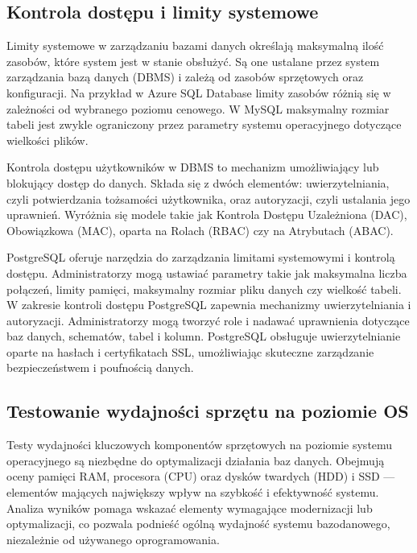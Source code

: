 \documentclass[a4paper,11pt,openany,english]{sphinxmanual}
\begin{document}
\subsection{Kontrola dostępu i limity systemowe}
\label{\detokenize{rozdzial2/Wydajnosc-Skalowanie-i-Replikacja/index:kontrola-dostepu-i-limity-systemowe}}
\sphinxAtStartPar
Limity systemowe w zarządzaniu bazami danych określają maksymalną ilość zasobów, które system jest w stanie obsłużyć. Są one ustalane przez system zarządzania bazą danych (DBMS) i zależą od zasobów sprzętowych oraz konfiguracji. Na przykład w Azure SQL Database limity zasobów różnią się w zależności od wybranego poziomu cenowego. W MySQL maksymalny rozmiar tabeli jest zwykle ograniczony przez parametry systemu operacyjnego dotyczące wielkości plików.

\sphinxAtStartPar
Kontrola dostępu użytkowników w DBMS to mechanizm umożliwiający lub blokujący dostęp do danych. Składa się z dwóch elementów: uwierzytelniania, czyli potwierdzania tożsamości użytkownika, oraz autoryzacji, czyli ustalania jego uprawnień. Wyróżnia się modele takie jak Kontrola Dostępu Uzależniona (DAC), Obowiązkowa (MAC), oparta na Rolach (RBAC) czy na Atrybutach (ABAC).

\sphinxAtStartPar
PostgreSQL oferuje narzędzia do zarządzania limitami systemowymi i kontrolą dostępu. Administratorzy mogą ustawiać parametry takie jak maksymalna liczba połączeń, limity pamięci, maksymalny rozmiar pliku danych czy wielkość tabeli. W zakresie kontroli dostępu PostgreSQL zapewnia mechanizmy uwierzytelniania i autoryzacji. Administratorzy mogą tworzyć role i nadawać uprawnienia dotyczące baz danych, schematów, tabel i kolumn. PostgreSQL obsługuje uwierzytelnianie oparte na hasłach i certyfikatach SSL, umożliwiając skuteczne zarządzanie bezpieczeństwem i poufnością danych.


\subsection{Testowanie wydajności sprzętu na poziomie OS}
\label{\detokenize{rozdzial2/Wydajnosc-Skalowanie-i-Replikacja/index:testowanie-wydajnosci-sprzetu-na-poziomie-os}}
\sphinxAtStartPar
Testy wydajności kluczowych komponentów sprzętowych na poziomie systemu operacyjnego są niezbędne do optymalizacji działania baz danych. Obejmują oceny pamięci RAM, procesora (CPU) oraz dysków twardych (HDD) i SSD — elementów mających największy wpływ na szybkość i efektywność systemu. Analiza wyników pomaga wskazać elementy wymagające modernizacji lub optymalizacji, co pozwala podnieść ogólną wydajność systemu bazodanowego, niezależnie od używanego oprogramowania.
\end{document}
